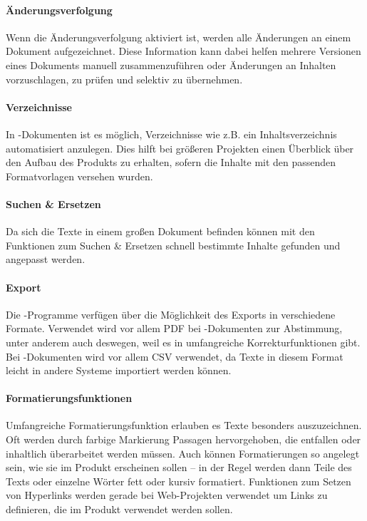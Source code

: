 \paragraph{Änderungsverfolgung} Wenn die Änderungsverfolgung aktiviert ist, werden alle Änderungen an einem Dokument aufgezeichnet. Diese Information kann dabei helfen mehrere Versionen eines Dokuments manuell zusammenzuführen oder Änderungen an Inhalten vorzuschlagen, zu prüfen und selektiv zu übernehmen.

\paragraph{Verzeichnisse} In -Dokumenten ist es möglich, Verzeichnisse wie z.B. ein Inhaltsverzeichnis automatisiert anzulegen. Dies hilft bei größeren Projekten einen Überblick über den Aufbau des Produkts zu erhalten, sofern die Inhalte mit den passenden Formatvorlagen versehen wurden.

\paragraph{Suchen \& Ersetzen} Da sich die Texte in einem großen Dokument befinden können mit den Funktionen zum Suchen \& Ersetzen schnell bestimmte Inhalte gefunden und angepasst werden.

\paragraph{Export} Die -Programme verfügen über die Möglichkeit des Exports in verschiedene Formate. Verwendet wird vor allem PDF bei -Dokumenten zur Abstimmung, unter anderem auch deswegen, weil es in   umfangreiche Korrekturfunktionen gibt. Bei -Dokumenten wird vor allem CSV verwendet, da Texte in diesem Format leicht in andere Systeme importiert werden können.

\paragraph{Formatierungsfunktionen} Umfangreiche Formatierungsfunktion erlauben es Texte besonders auszuzeichnen. Oft werden durch farbige Markierung Passagen hervorgehoben, die entfallen oder inhaltlich überarbeitet werden müssen. Auch können Formatierungen so angelegt sein, wie sie im Produkt erscheinen sollen -- in der Regel werden dann Teile des Texts oder einzelne Wörter fett oder kursiv formatiert. Funktionen zum Setzen von Hyperlinks werden gerade bei Web-Projekten verwendet um Links zu definieren, die im Produkt verwendet werden sollen.

